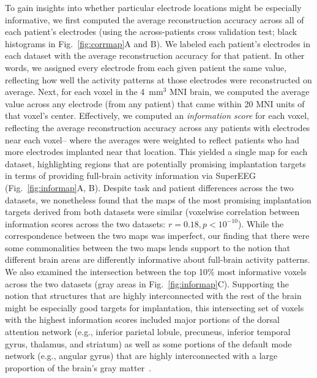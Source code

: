 \documentclass[11pt]{article}
\begin{document}
To gain insights into whether particular electrode locations might be
especially informative, we first computed the average reconstruction
accuracy across all of each patient's electrodes (using the
across-patients cross validation test; black histograms in
Fig.~\ref{fig:corrmap}A and B).  We labeled each patient's electrodes
in each dataset with the average reconstruction accuracy for that
patient.  In other words, we assigned every electrode from each given
patient the same value, reflecting how well the activity patterns at
those electrodes were reconstructed on average.  Next, for each voxel
in the 4~mm$^3$ MNI brain, we computed the average value across any
electrode (from any patient) that came within 20 MNI units of that
voxel's center.  Effectively, we computed an \textit{information
  score} for each voxel, reflecting the average reconstruction
accuracy across any patients with electrodes near each voxel-- where
the averages were weighted to reflect patients who had more electrodes
implanted near that location. This yielded a single map for each
dataset, highlighting regions that are potentially promising
implantation targets in terms of providing full-brain activity
information via SuperEEG (Fig.~\ref{fig:informap}A, B).  Despite task
and patient differences across the two datasets, we nonetheless found
that the maps of the most promising implantation targets derived from
both datasets were similar (voxelwise correlation between information
scores across the two datasets: $r = 0.18, p < 10^{-10}$).  While the
correspondence between the two maps was imperfect, our finding that
there were some commonalities between the two maps lends support to
the notion that different brain areas are differently informative
about full-brain activity patterns.  We also examined the intersection
between the top 10\% most informative voxels across the two datasets
(gray areas in Fig.~\ref{fig:informap}C).
Supporting the notion that structures that are highly interconnected
with the rest of the brain might be especially good targets for
implantation, this intersecting set of voxels with the highest
information scores included major portions of the dorsal attention
network (e.g., inferior parietal lobule, precuneus, inferior temporal
gyrus, thalamus, and striatum) as well as some portions of the default
mode network (e.g., angular gyrus) that are highly interconnected with
a large proportion of the brain's gray matter~\citep[e.g., ][]{TomaVolk11}.
\end{document}
